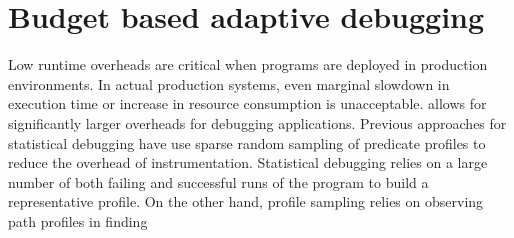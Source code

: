 \section{Budget based adaptive debugging}
\label{sec:adaptive}

Low runtime overheads are critical when programs are deployed in production environments.
In actual production systems, even marginal slowdown in execution time or increase in resource consumption is unacceptable. 
\livedebugging allows for significantly larger overheads for debugging applications.
Previous approaches for statistical debugging have use sparse random sampling of predicate profiles to reduce the overhead of instrumentation.
Statistical debugging relies on a large number of both failing and successful runs of the program to build a representative profile.
On the other hand, profile sampling relies on observing path profiles in finding
